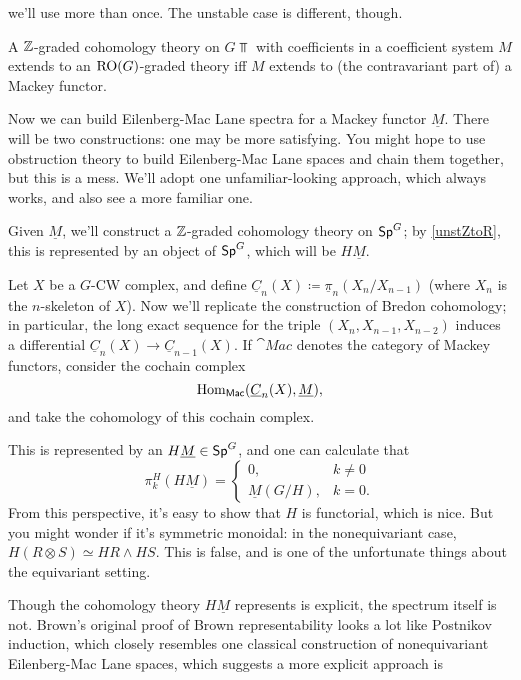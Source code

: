 we'll use more than once. The unstable case is different, though.
\begin{cor}
\label{unstZtoR}
A $\mathbb Z$-graded cohomology theory on $G\Top$ with coefficients in a coefficient system $M$ extends to an
$\mathrm{RO}(G)$-graded theory iff $M$ extends to (the contravariant part of) a Mackey functor.
\end{cor}
Now we can build Eilenberg-Mac Lane spectra for a Mackey functor $\underline M$. There will be two constructions:
one may be more satisfying. You might hope to use obstruction theory to build Eilenberg-Mac Lane spaces and chain
them together, but this is a mess. We'll adopt one unfamiliar-looking approach, which always works, and also see a
more familiar one.
\begin{cons}
Given $\underline M$, we'll construct a $\mathbb Z$-graded cohomology theory on $\mathsf{Sp}^G$; by \cref{unstZtoR}, this is
represented by an object of $\mathsf{Sp}^G$, which will be $H\underline M$.

Let $X$ be a $G$-CW complex, and define $\underline C_n(X)\coloneqq \underline\pi_n(X_n/X_{n-1})$ (where $X_n$ is
the $n$-skeleton of $X$). Now we'll replicate the construction of Bredon cohomology; in
particular, the long exact sequence for the triple $(X_n, X_{n-1}, X_{n-2})$ induces a differential $\underline
C_n(X)\to\underline C_{n-1}(X)$. If $\cat{Mac}$ denotes the category of Mackey functors, consider the cochain
complex
\[\operatorname{Hom}_{\mathsf{Mac}}(\underline C_n(X), \underline M),\]
and take the cohomology of this cochain complex.

This is represented by an  $H\underline M\in\mathsf{Sp}^G$, and one can calculate that
\[\pi_k^H(H\underline M) = \begin{cases}
	0, &k\ne 0\\
	\underline M(G/H), &k = 0.
\end{cases}\]
From this perspective, it's easy to show that $H$ is functorial, which is nice. But you might wonder if it's
symmetric monoidal: in the nonequivariant case, $H(R\otimes S)\simeq HR\wedge HS$. This is false, and is one of
the unfortunate things about the equivariant setting.
\end{cons}
Though the cohomology theory $H\underline M$ represents is explicit, the spectrum itself is not. Brown's original
proof of Brown representability \cite{Brown} looks a lot like Postnikov induction, which closely resembles one
classical construction of nonequivariant Eilenberg-Mac Lane spaces, which suggests a more explicit approach is
